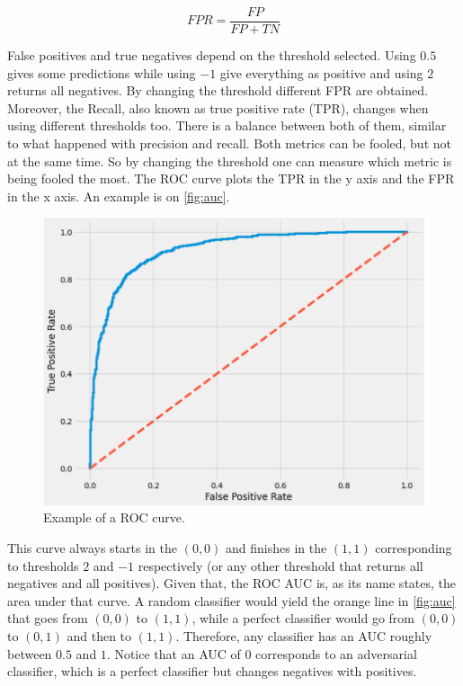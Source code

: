 \begin{equation}
    FPR = \frac{FP}{FP + TN}
\end{equation}

False positives and true negatives depend on the threshold selected. Using $0.5$ gives some predictions while using $-1$ give everything as positive and using $2$ returns all negatives. By changing the threshold different FPR are obtained. Moreover, the Recall, also known as true positive rate (TPR), changes when using different thresholds too. There is a balance between both of them, similar to what happened with precision and recall. Both metrics can be fooled, but not at the same time. So by changing the threshold one can measure which metric is being fooled the most. The ROC curve plots the TPR in the y axis and the FPR in the x axis. An example is on \autoref{fig:auc}.

\begin{figure}[ht]
    \centering
    \includegraphics[width=\textwidth]{imgs/auc.png}
    \caption{Example of a ROC curve.}
    \label{fig:auc}
\end{figure}

This curve always starts in the $(0,0)$ and finishes in the $(1,1)$ corresponding to thresholds $2$ and $-1$ respectively (or any other threshold that returns all negatives and all positives). Given that, the ROC AUC is, as its name states, the area under that curve. A random classifier would yield the orange line in \autoref{fig:auc} that goes from $(0,0)$ to $(1,1)$, while a perfect classifier would go from $(0,0)$ to $(0,1)$ and then to $(1,1)$. Therefore, any classifier has an AUC roughly between $0.5$ and $1$. Notice that an AUC of $0$ corresponds to an adversarial classifier, which is a perfect classifier but changes negatives with positives.

